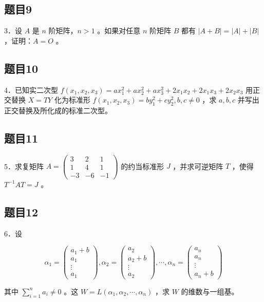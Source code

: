 \documentclass{article}
\begin{document}
\subsection{题目9}
3．设 \(A\) 是 \(n\) 阶矩阵，\(n>1\) 。如果对任意 \(n\) 阶矩阵 \(B\) 都有 \(|A+B|=|A|+|B|\) ，证明：\(A=O\) 。

\subsection{题目10}
4．已知实二次型 \(f\left(x_{1}, x_{2}, x_{3}\right)=a x_{1}^{2}+a x_{2}^{2}+a x_{3}^{2}+2 x_{1} x_{2}+2 x_{1} x_{3}+2 x_{2} x_{3}\) 用正交替换 \(X=T Y\) 化为标准形 \(f\left(x_{1}, x_{2}, x_{3}\right)=b y_{1}^{2}+c y_{2}^{2}, b, c \neq 0\) ，求 \(a, b, c\) 并写出正交替换及所化成的标准二次型。

\subsection{题目11}
5．求复矩阵 \(A=\left(\begin{array}{ccc}3 & 2 & 1 \\ 1 & 4 & 1 \\ -3 & -6 & -1\end{array}\right)\) 的约当标准形 \(J\) ，并求可逆矩阵 \(T\) ，使得 \(T^{-1} A T=J\) 。

\subsection{题目12}
6．设

\[
\alpha_{1}=\left(\begin{array}{c}
a_{1}+b \\
a_{1} \\
\vdots \\
a_{1}
\end{array}\right), \alpha_{2}=\left(\begin{array}{c}
a_{2} \\
a_{2}+b \\
\vdots \\
a_{2}
\end{array}\right), \cdots, \alpha_{n}=\left(\begin{array}{c}
a_{n} \\
a_{n} \\
\vdots \\
a_{n}+b
\end{array}\right)
\]

其中 \(\sum_{i=1}^{n} a_{i} \neq 0\) 。这 \(W=L\left(\alpha_{1}, \alpha_{2}, \cdots, \alpha_{n}\right)\) ，求 \(W\) 的维数与一组基。
\end{document}
